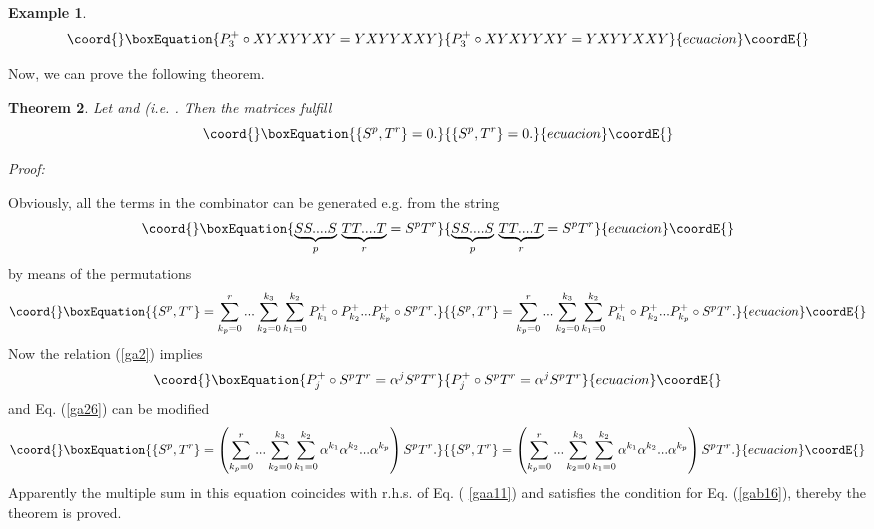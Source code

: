 \documentclass[a4paper,a4paper]{article}
\newtheorem{theorem}{Theorem}
\newtheorem{example}[theorem]{Example}
\begin{document}
\begin{example}
\begin{equation}\coord{}\boxEquation{  \label{ga24}
P_3^{+}\circ XYXYYXY=YXYYXXY
}{  P_3^{+}\circ XYXYYXY=YXYYXXY
}{ecuacion}\coordE{}\end{equation}
\end{example}

\noindent Now, we can prove the following theorem.

\begin{theorem}
\label{tst}Let \coordHE{} and \coordHE{} (i.e. \coordHE{}. Then the
matrices \coordHE{} fulfill 
\begin{equation}\coord{}\boxEquation{  \label{ga25}
\{S^p,T^r\}=0.
}{  \{S^p,T^r\}=0.
}{ecuacion}\coordE{}\end{equation}
\end{theorem}

\noindent \textit{Proof:}

\noindent Obviously, all the terms in the combinator \coordHE{} can
be generated e.g. from the string 
\begin{equation*}\coord{}\boxEquation{
\underset{p}{{\underbrace{SS....S}}}{\ }\underset{r}{{\underbrace{TT....T}}}
=S^{p}T^{r}
}{
\underset{p}{{\underbrace{SS....S}}}{\ }\underset{r}{{\underbrace{TT....T}}}
=S^{p}T^{r}
}{ecuacion}\coordE{}\end{equation*}%
by means of the permutations \coordHE{}%
\begin{equation}\coord{}\boxEquation{
\{S^{p},T^{r}\}=\sum_{k_{p}=0}^{r}...\sum_{k_{2}=0}^{k_{3}}
\sum_{k_{1}=0}^{k_{2}}P_{k_{1}}^{+}\circ P_{k_{2}}^{+}...P_{k_{p}}^{+}\circ
S^{p}T^{r}.  \label{ga26}
}{
\{S^{p},T^{r}\}=\sum_{k_{p}=0}^{r}...\sum_{k_{2}=0}^{k_{3}}
\sum_{k_{1}=0}^{k_{2}}P_{k_{1}}^{+}\circ P_{k_{2}}^{+}...P_{k_{p}}^{+}\circ
S^{p}T^{r}.  }{ecuacion}\coordE{}\end{equation}%
Now the relation (\ref{ga2}) implies%
\begin{equation*}\coord{}\boxEquation{
P_{j}^{+}\circ S^{p}T^{r}=\alpha ^{j}S^{p}T^{r}
}{
P_{j}^{+}\circ S^{p}T^{r}=\alpha ^{j}S^{p}T^{r}
}{ecuacion}\coordE{}\end{equation*}%
and Eq. (\ref{ga26}) can be modified 
\begin{equation}\coord{}\boxEquation{
\{S^{p},T^{r}\}=\left(
\sum_{k_{p}=0}^{r}...\sum_{k_{2}=0}^{k_{3}}\sum_{k_{1}=0}^{k_{2}}\alpha
^{k_{1}}\alpha ^{k_{2}}...\alpha ^{k_{p}}\right) S^{p}T^{r}.  \label{gaa26}
}{
\{S^{p},T^{r}\}=\left(
\sum_{k_{p}=0}^{r}...\sum_{k_{2}=0}^{k_{3}}\sum_{k_{1}=0}^{k_{2}}\alpha
^{k_{1}}\alpha ^{k_{2}}...\alpha ^{k_{p}}\right) S^{p}T^{r}.  }{ecuacion}\coordE{}\end{equation}%
Apparently the multiple sum in this equation coincides with r.h.s. of Eq. (%
\ref{gaa11}) and satisfies the condition for Eq. (\ref{gab16}), thereby the
theorem is proved.
\end{document}
